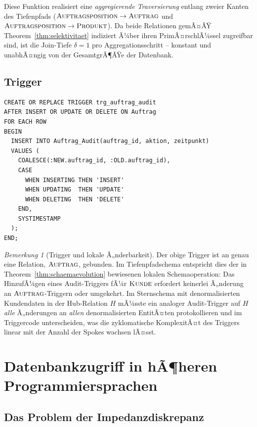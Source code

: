 ﻿\documentclass[a4paper,12pt]{report}
\theoremstyle{definition}
\theoremstyle{remark}
\newtheorem{remark}{Bemerkung}[chapter]
\begin{document}
Diese Funktion realisiert eine \emph{aggregierende Traversierung}
entlang zweier Kanten des Tiefenpfads
($\textsc{Auftragsposition}\to\textsc{Auftrag}$ und
$\textsc{Auftragsposition}\to\textsc{Produkt}$). Da beide Relationen
gemÃ¤ÃŸ Theorem~\ref{thm:selektivitaet} indiziert Ã¼ber ihren
PrimÃ¤rschlÃ¼ssel zugreifbar sind, ist die Join-Tiefe $\delta=1$ pro
Aggregationsschritt -- konstant und unabhÃ¤ngig von der GesamtgrÃ¶ÃŸe der
Datenbank.

\section{Trigger}

\begin{lstlisting}
CREATE OR REPLACE TRIGGER trg_auftrag_audit
AFTER INSERT OR UPDATE OR DELETE ON Auftrag
FOR EACH ROW
BEGIN
  INSERT INTO Auftrag_Audit(auftrag_id, aktion, zeitpunkt)
  VALUES (
    COALESCE(:NEW.auftrag_id, :OLD.auftrag_id),
    CASE
      WHEN INSERTING THEN 'INSERT'
      WHEN UPDATING  THEN 'UPDATE'
      WHEN DELETING  THEN 'DELETE'
    END,
    SYSTIMESTAMP
  );
END;
\end{lstlisting}

\begin{remark}[Trigger und lokale Ã„nderbarkeit]
Der obige Trigger ist an genau eine Relation, $\textsc{Auftrag}$,
gebunden. Im Tiefenpfadschema entspricht dies der in
Theorem~\ref{thm:schaemaevolution} bewiesenen lokalen
Schemaoperation: Das HinzufÃ¼gen eines Audit-Triggers fÃ¼r
$\textsc{Kunde}$ erfordert keinerlei Ã„nderung an
$\textsc{Auftrag}$-Triggern oder umgekehrt. Im Sternschema mit
denormalisierten Kundendaten in der Hub-Relation $H$ mÃ¼sste ein
analoger Audit-Trigger auf $H$ \emph{alle} Ã„nderungen an \emph{allen}
denormalisierten EntitÃ¤ten protokollieren und im Triggercode
unterscheiden, was die zyklomatische KomplexitÃ¤t des Triggers linear
mit der Anzahl der Spokes wachsen lÃ¤sst.
\end{remark}

\chapter{Datenbankzugriff in hÃ¶heren Programmiersprachen}
\label{ch:hostsprachen}

\section{Das Problem der Impedanzdiskrepanz}
\label{sec:impedanz}
\end{document}
